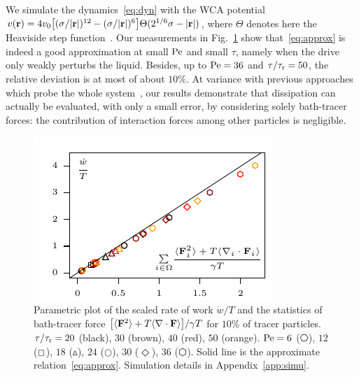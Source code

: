 \documentclass[pre, superscriptaddress, twocolumn,pre]{revtex4-1}
\begin{document}
We simulate the dynamics~\eqref{eq:dyn} with the WCA potential $v({\bf r})=4v_0\big[(\sigma/|{\bf r}|)^{12}-(\sigma/|{\bf r}|)^6\big]\Theta(2^{1/6}\sigma-|{\bf r}|)$, where $\Theta$ denotes here the Heaviside step function~\cite{WCA1971}. Our measurements in Fig.~\ref{fig:fig1} show that~\eqref{eq:approx} is indeed a good approximation at small $\rm Pe$ and small $\tau$, namely when the drive only weakly perturbs the liquid. Besides, up to ${\rm Pe}=36$ and $\tau/\tau_{\rm r}=50$, the relative deviation is at most of about $10\%$. At variance with previous approaches which probe the whole system~\cite{Harada2005,Harada2006}, our results demonstrate that dissipation can actually be evaluated, with only a small error, by considering solely bath-tracer forces: the contribution of interaction forces among other particles is negligible.


\begin{figure}
	\centering
	\includegraphics[width=\linewidth]{fig1.pdf}
	\caption{\label{fig:fig1}
		Parametric plot of the scaled rate of work $\dot w/T$ and the statistics of  bath-tracer force $\big[\langle{\bf F}^2\rangle + T\langle\nabla\cdot{\bf F}\rangle\big]/\gamma T$ for $10\%$ of tracer particles. $\tau/\tau_{\rm r}=20$ (black), $30$ (brown), $40$ (red), $50$ (orange). ${\rm Pe}=6$ ($\hexagon$), $12$ ($\boxempty$), $18$ ({\large$\vartriangle$}), $24$ ({$\Circle$}), $30$ (${\Diamond}$), $36$ ($\varhexagon$). Solid line is the approximate relation~\eqref{eq:approx}.
		Simulation details in Appendix~\ref{app:simu}.
	}
\end{figure}
\end{document}
